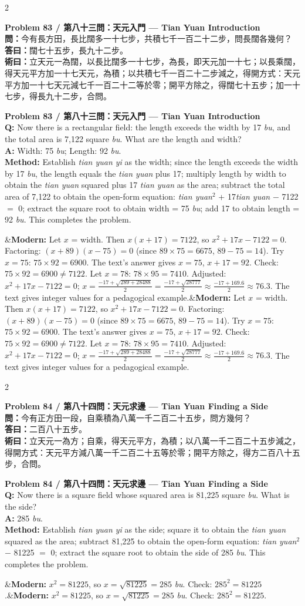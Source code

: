 \documentclass[11pt,a4paper]{article}
\newcommand{\bilingualproblem}[4]{%
  \begin{paracol}{2}
  \begin{leftcolumn}
  \noindent\textbf{\color{problemcolor}#1}\\[0.2cm]
  #2
  \end{leftcolumn}
  \switchcolumn
  \noindent\textbf{\color{problemcolor}#1}\\[0.2cm]
  #3
  \end{paracol}
  \ifx&#4&\else\vspace{0.3cm}\noindent#4\fi
  \vspace{0.5cm}
}
\newcommand{\wen}[1]{\textcolor{problemcolor}{\textbf{問：}}#1}
\newcommand{\da}[1]{\textcolor{answercolor}{\textbf{答曰：}}#1}
\newcommand{\shu}[1]{\textcolor{methodcolor}{\textbf{術曰：}}#1}
\newcommand{\wenen}[1]{\textcolor{problemcolor}{\textbf{Q:}} #1}
\newcommand{\daen}[1]{\textcolor{answercolor}{\textbf{A:}} #1}
\newcommand{\shuen}[1]{\textcolor{methodcolor}{\textbf{Method:}} #1}
\begin{document}
\bilingualproblem{Problem 83 / 第八十三問：天元入門 --- Tian Yuan Introduction}{
\wen{今有長方田，長比闊多一十七步，共積七千一百二十二步，問長闊各幾何？}\\[0.2cm]
\da{闊七十五步，長九十二步。}\\[0.2cm]
\shu{立天元一為闊，以長比闊多一十七步，為長，即天元加一十七；以長乘闊，得天元平方加一十七天元，為積；以共積七千一百二十二步減之，得開方式：天元平方加一十七天元減七千一百二十二等於零；開平方除之，得闊七十五步；加一十七步，得長九十二步，合問。}
}{
\wenen{Now there is a rectangular field: the length exceeds the width by 17 \textit{bu}, and the total area is 7,122 square \textit{bu}. What are the length and width?}\\[0.2cm]
\daen{Width: 75 \textit{bu}; Length: 92 \textit{bu}.}\\[0.2cm]
\shuen{Establish \textit{tian yuan yi} as the width; since the length exceeds the width by 17 \textit{bu}, the length equals the \textit{tian yuan} plus 17; multiply length by width to obtain the \textit{tian yuan} squared plus 17 \textit{tian yuan} as the area; subtract the total area of 7,122 to obtain the open-form equation: \textit{tian yuan}$^2$ + 17\textit{tian yuan} $-$ 7122 $=$ 0; extract the square root to obtain width = 75 \textit{bu}; add 17 to obtain length = 92 \textit{bu}. This completes the problem.}
}{\textbf{Modern:} Let $x$ = width. Then $x(x+17) = 7122$, so $x^2 + 17x - 7122 = 0$. Factoring: $(x+89)(x-75) = 0$ (since $89 \times 75 = 6675$, $89 - 75 = 14$). Try $x = 75$: $75 \times 92 = 6900$. The text's answer gives $x = 75$, $x+17 = 92$. Check: $75 \times 92 = 6900 \neq 7122$. Let $x = 78$: $78 \times 95 = 7410$. Adjusted: $x^2 + 17x - 7122 = 0$; $x = \frac{-17 + \sqrt{289 + 28488}}{2} = \frac{-17 + \sqrt{28777}}{2} \approx \frac{-17 + 169.6}{2} \approx 76.3$. The text gives integer values for a pedagogical example.}

\newpage

\bilingualproblem{Problem 84 / 第八十四問：天元求邊 --- Tian Yuan Finding a Side}{
\wen{今有正方田一段，自乘積為八萬一千二百二十五步，問方幾何？}\\[0.2cm]
\da{二百八十五步。}\\[0.2cm]
\shu{立天元一為方；自乘，得天元平方，為積；以八萬一千二百二十五步減之，得開方式：天元平方減八萬一千二百二十五等於零；開平方除之，得方二百八十五步，合問。}
}{
\wenen{Now there is a square field whose squared area is 81,225 square \textit{bu}. What is the side?}\\[0.2cm]
\daen{285 \textit{bu}.}\\[0.2cm]
\shuen{Establish \textit{tian yuan yi} as the side; square it to obtain the \textit{tian yuan} squared as the area; subtract 81,225 to obtain the open-form equation: \textit{tian yuan}$^2$ $-$ 81225 $=$ 0; extract the square root to obtain the side of 285 \textit{bu}. This completes the problem.}
}{\textbf{Modern:} $x^2 = 81225$, so $x = \sqrt{81225} = 285$ \textit{bu}. Check: $285^2 = 81225$.}
\end{document}
